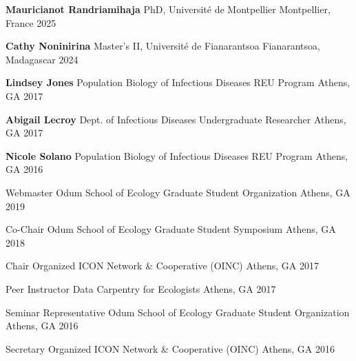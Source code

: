 \begin{cvhonors}


  \cvhonor
    {\textbf{Mauricianot Randriamihaja}} %
    {PhD, Université de Montpellier} %
    {Montpellier, France} %
    {2025} %

  \cvhonor
    {\textbf{Cathy Noninirina}} %
    {Master's II, Université de Fianarantsoa} %
    {Fianarantsoa, Madagascar} %
    {2024} %

  \cvhonor
    {\textbf{Lindsey Jones}} %
    {Population Biology of Infectious Diseases REU Program} %
    {Athens, GA} %
    {2017} %

  \cvhonor
    {\textbf{Abigail Lecroy}} %
    {Dept. of Infectious Diseases Undergraduate Researcher} %
    {Athens, GA} %
    {2017} %

  \cvhonor
    {\textbf{Nicole Solano}} %
    {Population Biology of Infectious Diseases REU Program} %
    {Athens, GA} %
    {2016} %

\end{cvhonors}


\begin{cvhonors}
\cvhonor
    {Webmaster} %
    {Odum School of Ecology Graduate Student Organization} %
    {Athens, GA} %
    {2019} %

\cvhonor
    {Co-Chair} %
    {Odum School of Ecology Graduate Student Symposium} %
    {Athens, GA} %
    {2018} %

\cvhonor
    {Chair} %
    {Organized ICON Network \& Cooperative (OINC)} %
    {Athens, GA} %
    {2017} %

\cvhonor
    {Peer Instructor} %
    {Data Carpentry for Ecologists} %
    {Athens, GA} %
    {2017} %

\cvhonor
    {Seminar Representative} %
    {Odum School of Ecology Graduate Student Organization} %
    {Athens, GA} %
    {2016} %

\cvhonor
    {Secretary} %
    {Organized ICON Network \& Cooperative (OINC)} %
    {Athens, GA} %
    {2016} %

\end{cvhonors}

